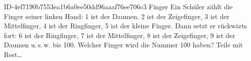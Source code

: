 \begin{exercise}
      {ID-4ef7190b7553ea1b6a0ee50dd96aaaf76ee706c3}
      {Finger}
  \ifproblem\problem
    Ein Schüler zählt die Finger seiner linken Hand:
    1 ist der Daumen,
    2 ist der Zeigefinger,
    3 ist der Mittelfinger,
    4 ist der Ringfinger,
    5 ist der kleine Finger.
    Dann setzt er rückwärts fort:
    6 ist der Ringfinger,
    7 ist der Mittelfinger,
    8 ist der Zeigefinger,
    9 ist der Daumen u.\,s.\,w. bis 100.
    Welcher Finger wird die Nummer 100 haben?
  \fi
  \ifoutline\outline
    Teile mit Rest\ldots
  \fi
\end{exercise}
